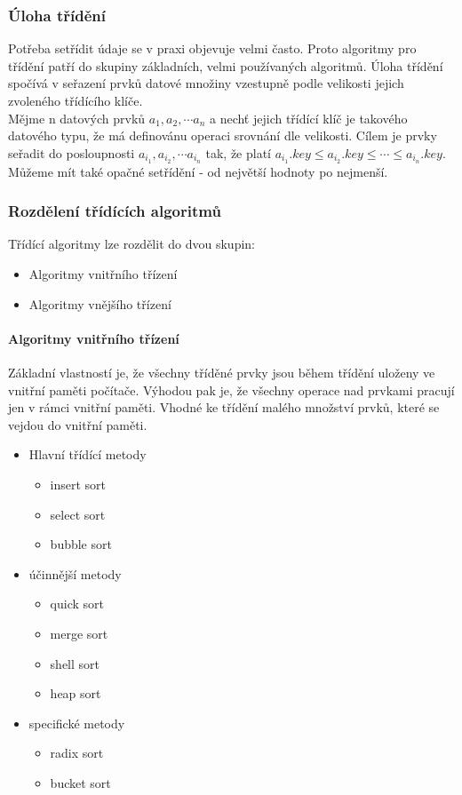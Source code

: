 \documentclass[10pt,a4paper]{article}
\begin{document}
\subsubsection{Úloha třídění}
Potřeba setřídit údaje se v praxi objevuje velmi často. Proto algoritmy pro třídění patří do skupiny základních, velmi používaných algoritmů. Úloha třídění spočívá v seřazení prvků datové množiny vzestupně podle velikosti jejich zvoleného třídícího klíče. \\
Mějme n datových prvků $a_1, a_2, \cdots a_n$ a nechť jejich třídící klíč je takového datového typu, že má definovánu operaci srovnání dle velikosti. Cílem je prvky seřadit do posloupnosti $a_{i_1}, a_{i_2}, \cdots a_{i_n}$ tak, že platí $a_{i_1}.key \leq a_{i_2}.key \leq \cdots \leq a_{i_n}.key$. Můžeme mít také opačné setřídění - od největší hodnoty po nejmenší. \\
\subsubsection{Rozdělení třídících algoritmů}
Třídící algoritmy lze rozdělit do dvou skupin:
\begin{itemize}
	\item Algoritmy vnitřního třízení
	\item Algoritmy vnějšího třízení
\end{itemize}
\paragraph{Algoritmy vnitřního třízení} Základní vlastností je, že všechny tříděné prvky jsou během třídění uloženy ve vnitřní paměti počítače. Výhodou pak je, že všechny operace nad prvkami pracují jen v rámci vnitřní paměti. Vhodné ke třídění malého množství prvků, které se vejdou do vnitřní paměti.
\begin{itemize}
	\item Hlavní třídící metody
	\begin{itemize}
		\item insert sort
		\item select sort
		\item bubble sort
	\end{itemize}
	\item účinnější metody
	\begin{itemize}
		\item quick sort
		\item merge sort
		\item shell sort
		\item heap sort
	\end{itemize}
	\item specifické metody
	\begin{itemize}
		\item radix sort
		\item bucket sort
	\end{itemize}
\end{itemize}
\end{document}
